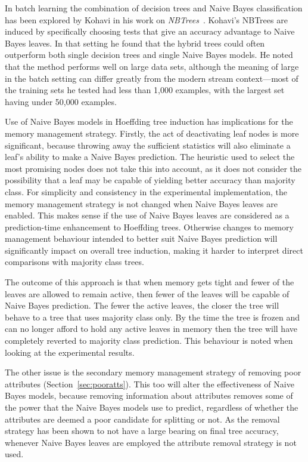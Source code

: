 In batch learning the combination of decision trees and Naive Bayes classification has been explored by Kohavi in his work on {\em NBTrees}~\cite{nbtree}. Kohavi's NBTrees are induced by specifically choosing tests that give an accuracy advantage to Naive Bayes leaves. In that setting he found that the hybrid trees could often outperform both single decision trees and single Naive Bayes models. He noted that the method performs well on large data sets, although the meaning of large in the batch setting can differ greatly from the modern stream context---most of the training sets he tested had less than 1,000 examples, with the largest set having under 50,000 examples.

Use of Naive Bayes models in Hoeffding tree induction has implications for the memory management strategy. Firstly, the act of deactivating leaf nodes is more significant, because throwing away the sufficient statistics will also eliminate a leaf's ability to make a Naive Bayes prediction. The heuristic used to select the most promising nodes does not take this into account, as it does not consider the possibility that a leaf may be capable of yielding better accuracy than majority class. For simplicity and consistency in the experimental implementation, the memory management strategy is not changed when Naive Bayes leaves are enabled. This makes sense if the use of Naive Bayes leaves are considered as a prediction-time enhancement to Hoeffding trees. Otherwise changes to memory management behaviour intended to better suit Naive Bayes prediction will significantly impact on overall tree induction, making it harder to interpret direct comparisons with majority class trees.

The outcome of this approach is that when memory gets tight and fewer of the leaves are allowed to remain active, then fewer of the leaves will be capable of Naive Bayes prediction. The fewer the active leaves, the closer the tree will behave to a tree that uses majority class only. By the time the tree is frozen and can no longer afford to hold any active leaves in memory then the tree will have completely reverted to majority class prediction. This behaviour is noted when looking at the experimental results.

The other issue is the secondary memory management strategy of removing poor attributes (Section~\ref{sec:pooratts}). This too will alter the effectiveness of Naive Bayes models, because removing information about attributes removes some of the power that the Naive Bayes models use to predict, regardless of whether the attributes are deemed a poor candidate for splitting or not. As the removal strategy has been shown to not have a large bearing on final tree accuracy, whenever Naive Bayes leaves are employed the attribute removal strategy is not used.

